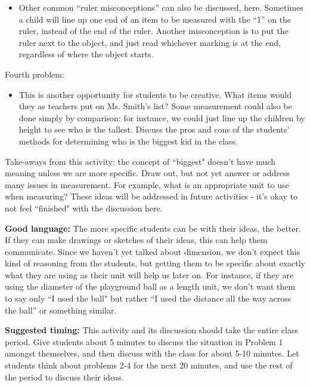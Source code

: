 \documentclass[nooutcomes,noauthor]{ximera}
\begin{document}
\begin{instructorNotes}
\begin{itemize}
      \item  Other common ``ruler misconceptions'' can also be discussed, here.  Sometimes a child will line up one end of an item to be measured with the ``1'' on the ruler, instead of the end of the ruler.  Another misconception is to put the ruler next to the object, and just read whichever marking is at the end, regardless of where the object starts.
\end{itemize}

Fourth problem:
\begin{itemize}
        \item This is another opportunity for students to be creative.  What items would they as teachers put on Ms. Smith's list?  Some measurement could also be done simply by comparison: for instance, we could just line up the children by height to see who is the tallest.  Discuss the pros and cons of the students' methods for determining who is the biggest kid in the class.
\end{itemize}




Take-aways from this activity: the concept of ``biggest" doesn't have much meaning unless we are more specific.  Draw out, but not yet answer or address many issues in measurement.  For example, what is an appropriate unit to use when measuring?  These ideas will be addressed in future activities - it's okay to not feel ``finished" with the discussion here.

{\bf Good language:} The more specific students can be with their ideas, the better. If they can make drawings or sketches of their ideas, this can help them communicate. Since we haven't yet talked about dimension, we don't expect this kind of reasoning from the students, but getting them to be specific about exactly what they are using as their unit will help us later on. For instance, if they are using the diameter of the playground ball as a length unit, we don't want them to say only ``I used the ball" but rather ``I used the distance all the way across the ball'' or something similar.

{\bf Suggested timing:} This activity and its discussion should take the entire class period.  Give students about 5 minutes to discuss the situation in Problem 1 amongst themselves, and then discuss with the class for about 5-10 minutes.  Let students think about problems 2-4 for the next 20 minutes, and use the rest of the period to discuss their ideas.

\end{instructorNotes}
\end{document}

